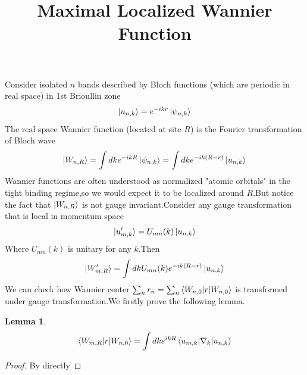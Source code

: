 \documentclass[a4paper,12pt]{article}
\title{Maximal Localized Wannier Function}
\theoremstyle{mystyle}
\newtheorem{lemma}{Lemma}
\theoremstyle{mystyle}
\numberwithin{equation}{section}
\begin{document}
	\maketitle
	Consider isolated $n$ bands described by Bloch functions (which are periodic in real space) in 1st Brioullin zone
	$$\ket{u_{n,k}}=e^{-ikr}\ket{\psi_{n,k}}$$
	The real space Wannier function (located at site $R$) is the Fourier transformation of Bloch wave
	$$\ket{W_{{n,R}}}=\int dk e^{-ikR}\ket{\psi_{n,k}}=\int dk e^{-ik(R-r)}\ket{u_{n,k}}$$
	Wannier functions are often understood as normalized "atomic orbitals" in the tight binding regime,so we would expect it to be localized around $R$.But notice the fact that $\ket{W_{n,R}}$ is not gauge invariant.Consider any gauge transformation that is local in momentum space
		$$\ket{u^\prime_{m,k}}=U_{mn}(k)\ket{u_{n,k}}$$
	Where $U_{mn}(k)$ is unitary for any $k$.Then
	$$\ket{W^\prime_{m,R}}=\int dk U_{mn}(k)e^{-ik(R-r)}\ket{u_{n,k}}$$
	We can check how Wannier center $\sum_n r_n=\sum_n\braket{W_{n,0}|r|W_{n,0}}$ is transformed under gauge transformation.We firstly prove the following lemma.
	\begin{lemma}
		$$\braket{W_{m,R}|r|W_{n,0}}=\int dk e^{ikR}\braket{u_{m,k}|\nabla_k|u_{n,k}}$$
	\end{lemma}
	\begin{proof}
		By directly 
	\end{proof}
\end{document}
